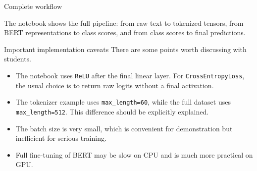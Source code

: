 \documentclass[aspectratio=169]{beamer}
\begin{document}
\begin{frame}{Complete workflow}
\begin{center}
\end{center}

\vspace{0.5cm}

The notebook shows the full pipeline: from raw text to tokenized tensors, from BERT representations to class scores, and from class scores to final predictions.
\end{frame}

\begin{frame}{Important implementation caveats}
There are some points worth discussing with students.

\begin{itemize}
    \item The notebook uses \texttt{ReLU} after the final linear layer. For \texttt{CrossEntropyLoss}, the usual choice is to return raw logits without a final activation.
    \item The tokenizer example uses \texttt{max\_length=60}, while the full dataset uses \texttt{max\_length=512}. This difference should be explicitly explained.
    \item The batch size is very small, which is convenient for demonstration but inefficient for serious training.
    \item Full fine-tuning of BERT may be slow on CPU and is much more practical on GPU.
\end{itemize}
\end{frame}
\end{document}
